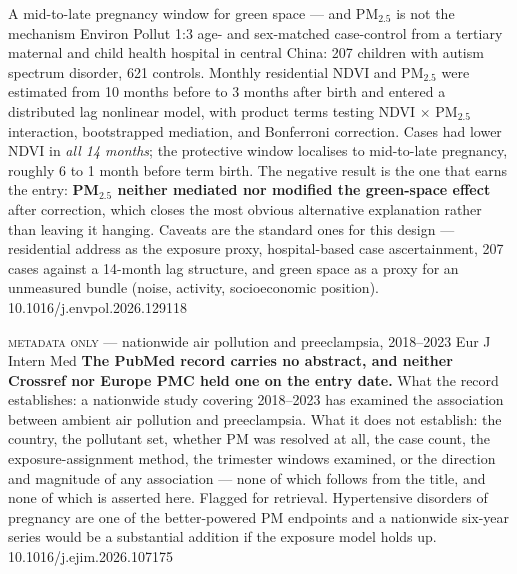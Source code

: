 \documentclass[10pt]{article}
\begin{document}
{A mid-to-late pregnancy window for green space --- and PM$_{2.5}$ is not the mechanism}
{Environ Pollut}
{1:3 age- and sex-matched case-control from a tertiary maternal and child health hospital in
central China: 207 children with autism spectrum disorder, 621 controls. Monthly residential
NDVI and PM$_{2.5}$ were estimated from 10 months before to 3 months after birth and entered
a distributed lag nonlinear model, with product terms testing NDVI $\times$ PM$_{2.5}$
interaction, bootstrapped mediation, and Bonferroni correction. Cases had lower NDVI in
\emph{all 14 months}; the protective window localises to mid-to-late pregnancy, roughly 6 to
1 month before term birth. The negative result is the one that earns the entry:
\textbf{PM$_{2.5}$ neither mediated nor modified the green-space effect} after correction,
which closes the most obvious alternative explanation rather than leaving it hanging.
Caveats are the standard ones for this design --- residential address as the exposure proxy,
hospital-based case ascertainment, 207 cases against a 14-month lag structure, and green
space as a proxy for an unmeasured bundle (noise, activity, socioeconomic position).}
{10.1016/j.envpol.2026.129118}

{\textsc{metadata only} --- nationwide air pollution and preeclampsia, 2018--2023}
{Eur J Intern Med}
{\textbf{The PubMed record carries no abstract, and neither Crossref nor Europe PMC held
one on the entry date.} What the record establishes: a nationwide study covering 2018--2023
has examined the association between ambient air pollution and preeclampsia. What it does
not establish: the country, the pollutant set, whether PM was resolved at all, the case
count, the exposure-assignment method, the trimester windows examined, or the direction and
magnitude of any association --- none of which follows from the title, and none of which is
asserted here. Flagged for retrieval. Hypertensive disorders of pregnancy are one of the
better-powered PM endpoints and a nationwide six-year series would be a substantial
addition if the exposure model holds up.}
{10.1016/j.ejim.2026.107175}

\end{document}
